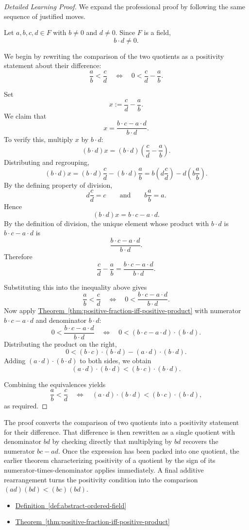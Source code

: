 \begin{proof}[Detailed Learning Proof]
\LRAProofBodyStart
We expand the professional proof by following the same sequence of justified moves.

Let $a,b,c,d\in F$ with $b\neq 0$ and $d\neq 0$.  Since $F$ is a field,
\[
b\cdot d\neq 0.
\]

We begin by rewriting the comparison of the two quotients as a positivity
statement about their difference:
\[
\frac{a}{b}<\frac{c}{d}
\quad\Longleftrightarrow\quad
0<\frac{c}{d}-\frac{a}{b}.
\]

Set
\[
x:=\frac{c}{d}-\frac{a}{b}.
\]
We claim that
\[
x=\frac{b\cdot c-a\cdot d}{b\cdot d}.
\]
To verify this, multiply $x$ by $b\cdot d$:
\[
(b\cdot d)x
=(b\cdot d)\left(\frac{c}{d}-\frac{a}{b}\right).
\]
Distributing and regrouping,
\[
(b\cdot d)x
=(b\cdot d)\frac{c}{d}-(b\cdot d)\frac{a}{b}
=b\left(d\frac{c}{d}\right)-d\left(b\frac{a}{b}\right).
\]
By the defining property of division,
\[
d\frac{c}{d}=c
\qquad\text{and}\qquad
b\frac{a}{b}=a.
\]
Hence
\[
(b\cdot d)x=b\cdot c-a\cdot d.
\]
By the definition of division, the unique element whose product with
$b\cdot d$ is $b\cdot c-a\cdot d$ is
\[
\frac{b\cdot c-a\cdot d}{b\cdot d}.
\]
Therefore
\[
\frac{c}{d}-\frac{a}{b}=\frac{b\cdot c-a\cdot d}{b\cdot d}.
\]

Substituting this into the inequality above gives
\[
\frac{a}{b}<\frac{c}{d}
\quad\Longleftrightarrow\quad
0<\frac{b\cdot c-a\cdot d}{b\cdot d}.
\]
Now apply
\hyperref[thm:positive-fraction-iff-positive-product]{Theorem~\ref*{thm:positive-fraction-iff-positive-product}}
with numerator $b\cdot c-a\cdot d$ and denominator $b\cdot d$:
\[
0<\frac{b\cdot c-a\cdot d}{b\cdot d}
\quad\Longleftrightarrow\quad
0<(b\cdot c-a\cdot d)\cdot(b\cdot d).
\]
Distributing the product on the right,
\[
0<(b\cdot c)\cdot(b\cdot d)-(a\cdot d)\cdot(b\cdot d).
\]
Adding $(a\cdot d)\cdot(b\cdot d)$ to both sides, we obtain
\[
(a\cdot d)\cdot(b\cdot d)<(b\cdot c)\cdot(b\cdot d).
\]

Combining the equivalences yields
\[
\frac{a}{b}<\frac{c}{d}
\quad\Longleftrightarrow\quad
(a\cdot d)\cdot(b\cdot d)<(b\cdot c)\cdot(b\cdot d),
\]
as required.
\end{proof}

\begin{remark*}
The proof converts the comparison of two quotients into a positivity statement
for their difference.  That difference is then rewritten as a single quotient
with denominator $bd$ by checking directly that multiplying by $bd$ recovers
the numerator $bc-ad$.  Once the expression has been packed into one quotient,
the earlier theorem characterizing positivity of a quotient by the sign of its
numerator-times-denominator applies immediately.  A final additive
rearrangement turns the positivity condition into the comparison
$(ad)(bd)<(bc)(bd)$.
\end{remark*}

\begin{dependencies}
\begin{itemize}
  \item \hyperref[def:abstract-ordered-field]{Definition~\ref*{def:abstract-ordered-field}}
  \item \hyperref[thm:positive-fraction-iff-positive-product]{Theorem~\ref*{thm:positive-fraction-iff-positive-product}}
\end{itemize}
\end{dependencies}

\clearpage
